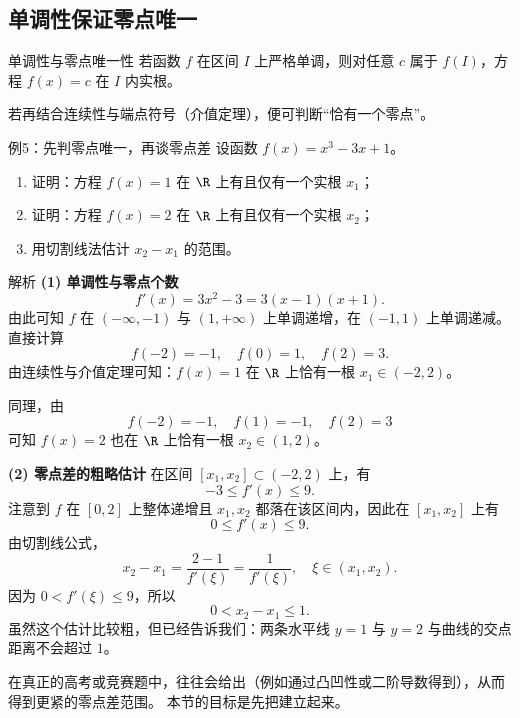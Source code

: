 \documentclass[a4paper,11pt]{ctexart}
\begin{document}
\subsection{单调性保证零点唯一}

\begin{definitionbox}{单调性与零点唯一性}
若函数 $f$ 在区间 $I$ 上严格单调，则对任意 $c$ 属于 $f(I)$，方程 $f(x)=c$ 在 $I$ 内实根。
\par
若再结合连续性与端点符号（介值定理），便可判断“恰有一个零点”。
\end{definitionbox}

\begin{examplebox}{例5：先判零点唯一，再谈零点差}
设函数 $f(x)=x^3-3x+1$。
\begin{enumerate}
  \item 证明：方程 $f(x)=1$ 在 $\R$ 上有且仅有一个实根 $x_1$；
  \item 证明：方程 $f(x)=2$ 在 $\R$ 上有且仅有一个实根 $x_2$；
  \item 用切割线法估计 $x_2-x_1$ 的范围。
\end{enumerate}
\end{examplebox}

\begin{proofbox}{解析}
\textbf{(1) 单调性与零点个数}
\[
f'(x)=3x^2-3=3(x-1)(x+1).
\]
由此可知 $f$ 在 $(-\infty,-1)$ 与 $(1,+\infty)$ 上单调递增，在 $(-1,1)$ 上单调递减。
直接计算
\[
f(-2)=-1,\quad f(0)=1,\quad f(2)=3.
\]
由连续性与介值定理可知：$f(x)=1$ 在 $\R$ 上恰有一根 $x_1\in(-2,2)$。
\par
同理，由
\[
f(-2)=-1,\quad f(1)=-1,\quad f(2)=3
\]
可知 $f(x)=2$ 也在 $\R$ 上恰有一根 $x_2\in(1,2)$。

\textbf{(2) 零点差的粗略估计}
在区间 $[x_1,x_2]\subset(-2,2)$ 上，有
\[
-3 \leq f'(x) \leq 9.
\]
注意到 $f$ 在 $[0,2]$ 上整体递增且 $x_1,x_2$ 都落在该区间内，因此在 $[x_1,x_2]$ 上有
\[
0 \leq f'(x) \leq 9.
\]
由切割线公式，
\[
x_2-x_1 = \frac{2-1}{f'(\xi)} = \frac{1}{f'(\xi)},\quad \xi\in(x_1,x_2).
\]
因为 $0<f'(\xi)\leq 9$，所以
\[
0< x_2-x_1 \leq 1.
\]
虽然这个估计比较粗，但已经告诉我们：两条水平线 $y=1$ 与 $y=2$ 与曲线的交点距离不会超过 $1$。
\end{proofbox}

\begin{sideinfobox}
在真正的高考或竞赛题中，往往会给出（例如通过凸凹性或二阶导数得到），从而得到更紧的零点差范围。
本节的目标是先把建立起来。
\end{sideinfobox}
\end{document}
